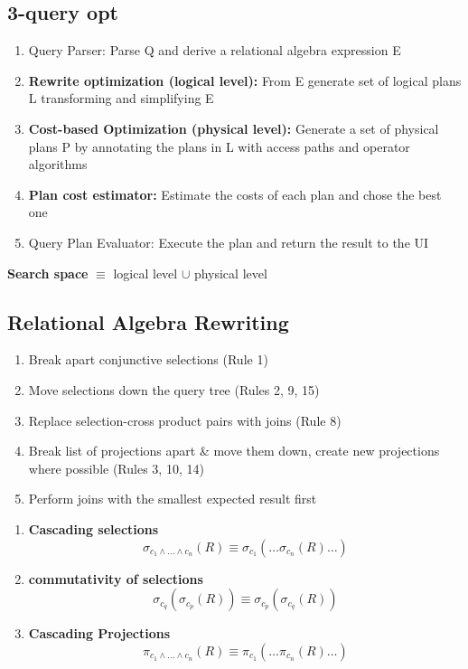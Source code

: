 \documentclass[a4paper]{article}
\begin{document}
\begin{twocolumn}
\section{3-query opt}
\begin{enumerate}
	\item Query Parser: Parse Q and derive a relational algebra expression E
	\item \textbf{Rewrite optimization (logical level):} From E generate set of logical plans L transforming and simplifying E
	\item \textbf{Cost-based Optimization (physical level):} Generate a set of physical plans P by annotating the plans in L with access paths and operator algorithms
	\item \textbf{Plan cost estimator:} Estimate the costs of each plan and chose the best one
	\item Query Plan Evaluator: Execute the plan and return the result to the UI
\end{enumerate}
\textbf{Search space} $\equiv$ logical level $\cup$ physical level

\subsection{Relational Algebra Rewriting}
\begin{enumerate}
	\item Break apart conjunctive selections (Rule 1)
	\item Move selections down the query tree (Rules 2, 9, 15)
	\item Replace selection-cross product pairs with joins (Rule 8)
	\item Break list of projections apart \& move them down, create new projections where possible (Rules 3, 10, 14)
	\item Perform joins with the smallest expected result first
\end{enumerate}
\begin{enumerate}
	\item \textbf{Cascading selections}
	\[ \sigma_{c_1 \wedge \dots \wedge c_n}(R) \equiv \sigma_{c_1}(\dots \sigma_{c_n}(R) \dots) \]
	
	\item \textbf{commutativity of selections}
	\[ \sigma_{c_q }( \sigma_{c_p}(R) ) \equiv \sigma_{c_p}( \sigma_{c_q}(R) ) \]
	
	\item \textbf{Cascading Projections}
	\[ \pi_{c_1 \wedge \dots \wedge c_n}(R) \equiv \pi_{c_1}(\dots \pi_{c_n}(R) \dots) \]
	

\end{enumerate}
\end{twocolumn}
\end{document}
